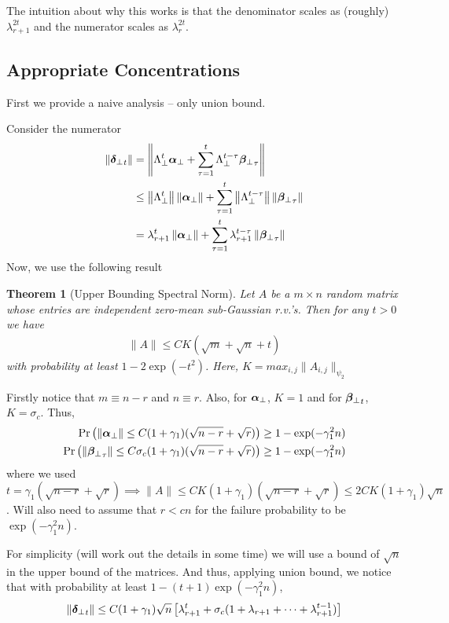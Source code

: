 \documentclass[10pt]{article}
\newtheorem{theorem}{Theorem}
\newcommand{\norm}[1]{\left\|#1\right\|}
\begin{document}
{\color{teal} 
The intuition about why this works is that the denominator scales as (roughly) $\lambda_{r+1}^{2t}$ and the numerator scales as $\lambda_{r}^{2t}$. 
}

\subsection{Appropriate Concentrations}

{\color{blue} First we provide a naive analysis -- only union bound.  }

Consider the numerator 
\begin{align*}
\|\utsin_t\| &= \norm{\Lambda_\perp^t \usin + \sum_{\tau=1}^t \Lambda_\perp^{t-\tau} \wsin_\tau} \\
&\leq \norm{\Lambda_\perp^t} \norm{\usin} + \sum_{\tau=1}^t \norm{\Lambda_\perp^{t-\tau}} \norm{\wsin_\tau} \\
& = \lambda_{r+1}^t \norm{\usin} + \sum_{\tau=1}^t \lambda_{r+1}^{t - \tau} \norm{\wsin_\tau}
\end{align*}
Now, we use the following result \cite[Theorem 4.4.5]{hdp_book} 
\begin{theorem}[Upper Bounding Spectral Norm] \label{thm:upper_bnd}
Let $A$ be a $m \times n$ random matrix whose entries are independent zero-mean sub-Gaussian r.v.'s. Then for any $t >0$ we have 
\begin{align*}
\|A\| \leq C K (\sqrt{m} + \sqrt{n} + t) 
\end{align*}
with probability at least $1 - 2 \exp(-t^2)$. Here, $K = max_{i,j} \|A_{i,j}\|_{\psi_2}$
\end{theorem}
Firstly notice that $m \equiv n-r$ and $n \equiv r$. Also, for $\bm{\alpha}_{\perp}$, $K = 1$ and for ${\bm{\beta}_{\perp}}_t$, $K = \sigma_c$. Thus, 
\begin{align*}
\Pr\left(\|\bm{\alpha}_{\perp}\| \leq C (1 + \gamma_1)(\sqrt{n-r} + \sqrt{r})\right) \geq  1 - \exp(- \gamma_1^2 n) \\
\Pr\left(\|{\bm{\beta}_{\perp}}_\tau\| \leq C \sigma_c (1 + \gamma_1)(\sqrt{n-r} + \sqrt{r}) \right) \geq  1 - \exp(- \gamma_1^2 n)
\end{align*}
where we used $t = \gamma_1 (\sqrt{n-r} + \sqrt{r}) \implies \|A\| \leq CK (1+ \gamma_1) (\sqrt{n-r} + \sqrt{r}) \leq 2CK (1+ \gamma_1) \sqrt{n}$. Will also need to assume that $r < cn$ for the failure probability to be $\exp(-\gamma_1^2 n)$.

For simplicity (will work out the  details in some time) we will use a bound of $\sqrt{n}$ in the upper bound of the matrices. And thus, applying union bound, we notice that with probability at least $1 - (t + 1) \exp(- \gamma_1^2 n)$, 
\begin{align*}
\|{\bm{\delta}_{\perp}}_t\| \leq C (1+ \gamma_1) \sqrt{n} \left[\lambda_{r+1}^t +  \sigma_c (1 + \lambda_{r+1} + \cdots +  \lambda_{r+1}^{t-1}) \right]
\end{align*}
\end{document}
